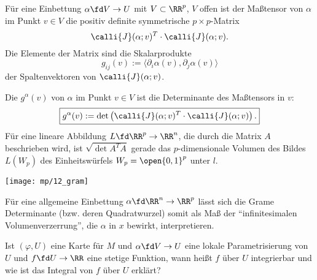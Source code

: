\begin{antwort} 
  Für eine Einbettung $\alpha\fd V\to U$ mit $V\subset \RR^p$, 
  $V$ offen ist der Maßtensor von $\alpha$ im Punkt 
  $v\in V$ die positiv definite symmetrische $p\times p$-Matrix 
  \[
  \calli{J}(\alpha;v)^T \cdot \calli{J}(\alpha;v).
  \]
  Die Elemente der Matrix sind die Skalarprodukte 
  \[
  g_{ij}(v) := \langle \partial_i \alpha(v), \partial_j \alpha(v) \rangle
  \]
  der Spaltenvektoren von $\calli{J}(\alpha;v)$.

  Die  $g^\alpha (v)$ 
  von $\alpha$ im Punkt $v\in V$ ist die Determinante des Maßtensors in $v$:
  \[
  \boxed{
    g^\alpha(v):= 
    \det\left( \calli{J}(\alpha;v)^T \cdot \calli{J}(\alpha;v) \right). 
  }
  \]
  Für eine lineare Abbildung $L\fd \RR^p\to\RR^n$, die durch die Matrix 
  $A$ beschrieben wird, ist $\sqrt{\det A^T A}$ 
  gerade das $p$-dimensionale Volumen des Bildes $L( W_p)$ des 
  Einheitswürfels $W_p = \open{0,1}^p$ unter $l$.

  \begin{center}
    \texttt{[image: mp/12\_gram]}
    \label{fig:12_gram}
  \end{center}

  Für eine allgemeine Einbettung $\alpha\fd\RR^n\to\RR^p$ 
  lässt sich die Gram\sch e Determinante (bzw. deren Quadratwurzel)
  somit als Maß der "`infinitesimalen Volumenverzerrung"', 
  die $\alpha$ in $x$ bewirkt, interpretieren. 
  \AntEnd
\end{antwort} 

\begin{frage}
  Ist $(\varphi,U)$ eine Karte für $M$ und $\alpha\fd V\to U$ 
  eine lokale Parametrisierung von $U$ und $f\fd U\to\RR$ eine 
  stetige Funktion, wann heißt $f$ über $U$ integrierbar und wie 
  ist das Integral von $f$ über $U$ erklärt?
\end{frage}

